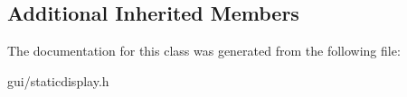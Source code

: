 \subsection*{Additional Inherited Members}


The documentation for this class was generated from the following file\+:\begin{DoxyCompactItemize}
\item 
gui/staticdisplay.\+h\end{DoxyCompactItemize}
